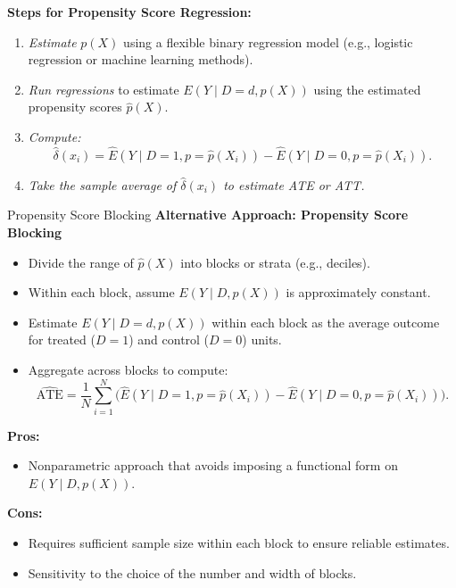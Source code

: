 \documentclass[xcolor=svgnames,t]{beamer}
\begin{document}
     \begin{frame}
        \textbf{Steps for Propensity Score Regression:}
        \begin{enumerate}
            \item \textit{Estimate} $p(X)$ using a flexible binary regression model (e.g., logistic regression or machine learning methods).
            \pause
            
            \item \textit{Run regressions} to estimate $E(Y \mid D=d, p(X))$ using the estimated propensity scores $\widehat{p}(X)$.
            \pause
            \item \textit{Compute:}
            \[
            \widehat{\delta}(x_i) = \widehat{E}(Y \mid D=1, p=\widehat{p}(X_i)) - \widehat{E}(Y \mid D=0, p=\widehat{p}(X_i)).
            \]
            \pause
            \item \textit{Take the sample average of $\widehat{\delta}(x_i)$ to estimate ATE or ATT.}
        \end{enumerate}
     \end{frame}   
        
        \begin{frame}{Propensity Score Blocking}
        \textbf{Alternative Approach: Propensity Score Blocking}
        \begin{itemize}
            \item Divide the range of $\widehat{p}(X)$ into blocks or strata (e.g., deciles).
            \pause
            \item Within each block, assume $E(Y \mid D, p(X))$ is approximately constant.
            \pause
            \item Estimate $E(Y \mid D=d, p(X))$ within each block as the average outcome for treated ($D=1$) and control ($D=0$) units.
            \pause
            \item Aggregate across blocks to compute:
            \[
            \widehat{\text{ATE}} = \frac{1}{N} \sum_{i=1}^N \bigl(\widehat{E}(Y \mid D=1, p=\widehat{p}(X_i)) - \widehat{E}(Y \mid D=0, p=\widehat{p}(X_i))\bigr).
            \]
        \end{itemize}
        
        \pause
        
        \textbf{Pros:}
        \begin{itemize}
            \item Nonparametric approach that avoids imposing a functional form on $E(Y \mid D, p(X))$.
        \end{itemize}
        
        \textbf{Cons:}
        \begin{itemize}
            \item Requires sufficient sample size within each block to ensure reliable estimates.
            \item Sensitivity to the choice of the number and width of blocks.
        \end{itemize}
        \end{frame}
        
\end{document}
